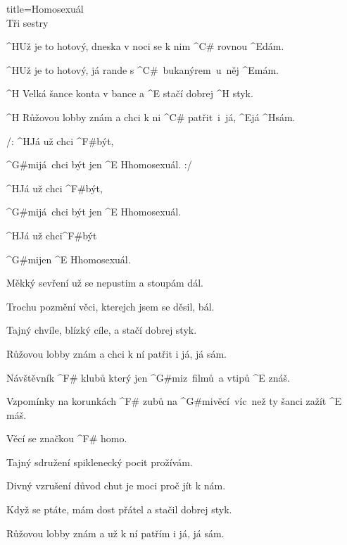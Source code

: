 \begin{song}{title=\predtitle\centering Homosexuál \\\large Tři sestry \vspace*{-0.3cm}}  %

\begin{centerjustified}
\velky

\sloka
	^{H}Už je to hotový, dneska v noci se k nim ^{C\# \z}rovnou ^{E}dám.

	^{H}Už je to hotový, já rande s ^{\z C\# \:\:\,}bukanýrem~u~něj ^{E}mám.

	^{H \z}Velká šance konta v bance a ^{E \z}stačí dobrej ^{H \z}styk.

	^{H \z}Růžovou lobby znám a chci k ni ^{\z C\# \:}patřit~i~já, ^{E}já ^{H}sám.

	/: ^{H}Já už chci ^{F\#}být,

	^{G\#mi\z}já~chci být jen ^{E \z H}homosexuál. :/

	^{H}Já už chci ^{F\#}být,

	^{G\#mi\z}já~chci být jen ^{E \z H}homosexuál.

	^{H}Já už chci^{F\#}být

	^{G\#mi}jen ^{E \z H}homosexuál.

\sloka
	Měkký sevření už se nepustim a stoupám dál.

	Trochu pozmění věci, kterejch jsem se děsil, bál.

	Tajný chvíle, blízký cíle, a stačí dobrej styk.

	Růžovou lobby znám a chci k ní patřit i já, já sám.


	Návštěvník ^{F# \z}klubů který jen ^{G\#mi}z~filmů~a vtipů ^{E \z}znáš.

	Vzpomínky na korunkách ^{F\# \z}zubů na ^{G\#mi}věcí~víc~než ty šanci zažít ^{E \,}máš.

	Věcí se značkou ^{F\# \z}homo.

\sloka
	Tajný sdružení spiklenecký pocit prožívám.

	Divný vzrušení důvod chut je moci proč jít k nám.

	Když se ptáte, mám dost přátel a stačil dobrej styk.
	
	Růžovou lobby znám a už k ní patřím i já, já sám.


\end{centerjustified}
\setcounter{Slokočet}{0}
\end{song}
